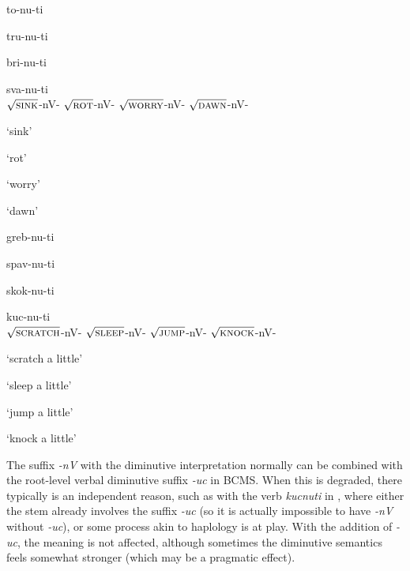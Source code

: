 \documentclass[output=paper,colorlinks,citecolor=brown]{langscibook}
\begin{document}
\ea \label{str:ex:types-a}

\gll \parbox{2.75cm}{to-nu-ti} \parbox{2.75cm}{tru-nu-ti} \parbox{3cm}{bri-nu-ti} sva-nu-ti \\
$\sqrt{\textsc{sink}}$-nV-{\INF} 
$\sqrt{\textsc{rot}}$-nV-{\INF} 
$\sqrt{\textsc{worry}}$-nV-{\INF} 
$\sqrt{\textsc{dawn}}$-nV-{\INF} \\
\glt \parbox{2.75cm}{`sink’} \parbox{2.75cm}{`rot’} \parbox{3cm}{`worry’} `dawn’

\ex

\gll \parbox{3cm}{greb-nu-ti} \parbox{2.75cm}{spav-nu-ti} \parbox{2.75cm}{skok-nu-ti} kuc-nu-ti\\ 
$\sqrt{\textsc{scratch}}$-nV-{\INF} $\sqrt{\textsc{sleep}}$-nV-{\INF} $\sqrt{\textsc{jump}}$-nV-{\INF} $\sqrt{\textsc{knock}}$-nV-{\INF}
\\
\glt \parbox{3cm}{`scratch a little’} \parbox{2.75cm}{`sleep a little’} \parbox{2.75cm}{`jump a little’} `knock a little’\label{str:ex:types-b} \\
\z

\noindent The suffix \textit{-nV} with the diminutive interpretation normally can be combined with the root-level verbal diminutive suffix \textit{-uc} in BCMS. When this is degraded, there typically is an independent reason, such as with the verb \textit{kucnuti} in , where either the stem already involves the suffix \textit{-uc} (so it is actually impossible to have \textit{-nV} without \textit{-uc}), or some process akin to haplology is at play. With the addition of \textit{-uc}, the meaning is not affected, although sometimes the diminutive semantics feels somewhat stronger (which may be a pragmatic effect).



\end{document}
